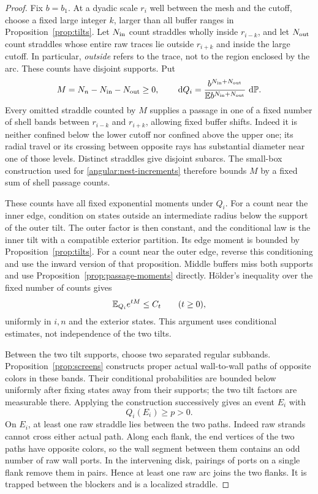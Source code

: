 \begin{proof}
Fix \(b=b_1\).  At a dyadic scale \(r_i\) well between
the mesh and the cutoff, choose a fixed large integer
\(k\), larger than all buffer ranges in
Proposition~\ref{prop:tilts}.  Let \(N_{\rm in}\) count
straddles wholly inside \(r_{i-k}\), and let \(N_{\rm out}\)
count straddles whose entire raw traces lie outside
\(r_{i+k}\) and inside the large cutoff.  In particular,
\emph{outside} refers to the trace, not to the region enclosed
by the arc.  These counts have disjoint supports.  Put
\[
 M=N_n-N_{\rm in}-N_{\rm out}\ge0,\qquad
 \,\mathrm d Q_i=
   \frac{b^{N_{\rm in}+N_{\rm out}}}
        {\mathbb E b^{N_{\rm in}+N_{\rm out}}}\,\,\mathrm d\mathbb P .
\]
Every omitted straddle counted by \(M\) supplies a passage
in one of a fixed number of shell bands between
\(r_{i-k}\) and \(r_{i+k}\), allowing fixed buffer shifts.
Indeed it is neither confined below the lower cutoff
nor confined above the upper one; its radial travel or
its crossing between opposite rays has substantial
diameter near one of those levels.  Distinct straddles
give disjoint subarcs.  The small-box construction used
for \eqref{angular:nest-increments} therefore bounds
\(M\) by a fixed sum of shell passage counts.

These counts have all fixed exponential moments under
\(Q_i\).  For a count near the inner edge, condition on
states outside an intermediate radius below the support
of the outer tilt.  The outer factor is then constant,
and the conditional law is the inner tilt with a
compatible exterior partition.  Its edge moment is
bounded by Proposition~\ref{prop:tilts}.  For a count
near the outer edge, reverse this conditioning and use
the inward version of that proposition.  Middle buffers
miss both supports and use
Proposition~\ref{prop:passage-moments} directly.  H\"older's
inequality over the fixed number of counts gives
\begin{equation}\label{angular:omitted-moments}
 \mathbb E_{Q_i}e^{tM}\le C_t\qquad(t\ge0),
\end{equation}
uniformly in \(i,n\) and the exterior states.  This
argument uses conditional estimates, not independence
of the two tilts.

Between the two tilt supports, choose two separated
regular subbands.  Proposition~\ref{prop:screens}
constructs proper actual wall-to-wall paths of opposite
colors in these bands.  Their conditional probabilities
are bounded below uniformly after fixing states away
from their supports; the two tilt factors are measurable
there.  Applying the construction successively gives an
event \(E_i\) with
\[
 Q_i(E_i)\ge p>0 .
\]
On \(E_i\), at least one raw straddle lies between the
two paths.  Indeed raw strands cannot cross either
actual path.  Along each flank, the end vertices of
the two paths have opposite colors, so the wall segment
between them contains an odd number of raw wall ports.
In the intervening disk, pairings of ports on a single
flank remove them in pairs.  Hence at least one raw
arc joins the two flanks.  It is trapped between the
blockers and is a localized straddle.


\end{proof}
